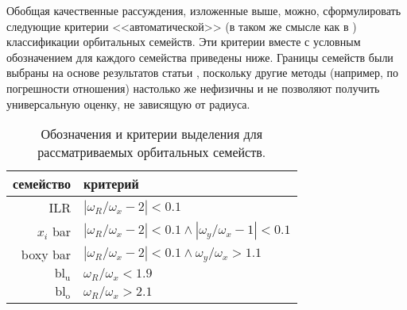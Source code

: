 \documentclass[tikz]{trlnotes}
\begin{document}
Обобщая качественные рассуждения, изложенные выше, можно,  сформулировать следующие критерии <<автоматической>> (в
таком же смысле как в \cite{valluri2016}) классификации орбитальных семейств. Эти критерии вместе с условным обозначением для каждого семейства приведены ниже.
Границы семейств были выбраны на основе результатов статьи \citet{portail2015}, поскольку другие методы (например, по погрешности отношения) настолько же нефизичны и не позволяют получить универсальную оценку, не зависящую от радиуса.
\begin{table}[htpb]
    \centering
  \begin{tabular}{r|l}
    \toprule
    {семейство}   & критерий \\
    \midrule
    ILR & $|ω_R/ω_x - 2| < 0.1$ \\
    $x_i$ bar & $|ω_R/ω_x - 2| < 0.1 \land |ω_y/ω_x - 1| < 0.1$ \\
    boxy bar  & $|ω_R/ω_x - 2| < 0.1 \land  ω_y/ω_x > 1.1$ \\
    $\text{bl}_\text{u}$  & $ω_R/ω_x < 1.9$ \\
    $\text{bl}_\text{o}$  & $ω_R/ω_x > 2.1$ \\
    \bottomrule
  \end{tabular}
  \caption{Обозначения и критерии выделения для рассматриваемых орбитальных семейств.}
  \label{tab:orbfamiles}
\end{table}
\end{document}
